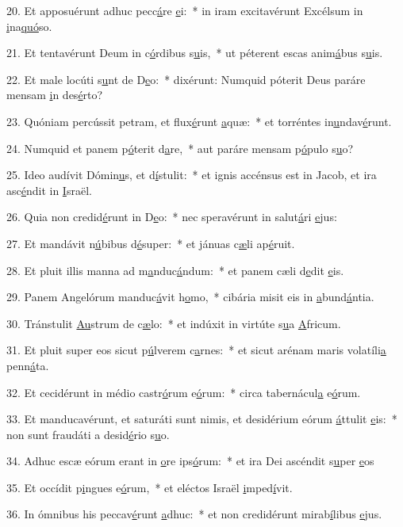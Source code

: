 20. Et apposuérunt adhuc pecc\uline{á}re \uline{e}i:~* in iram excitavérunt Excélsum in \uline{i}na\uline{quó}so.\par 
21. Et tentavérunt Deum in c\uline{ó}rdibus s\uline{u}is,~* ut péterent escas anim\uline{á}bus s\uline{u}is.\par 
22. Et male locúti s\uline{u}nt de D\uline{e}o:~* dixérunt: Numquid póterit Deus paráre mensam \uline{i}n des\uline{é}rto?\par 
23. Quóniam percússit petram, et flux\uline{é}runt \uline{a}quæ:~* et torréntes in\uline{u}ndav\uline{é}runt.\par 
24. Numquid et panem p\uline{ó}terit d\uline{a}re,~* aut paráre mensam p\uline{ó}pulo s\uline{u}o?\par 
25. Ideo audívit Dómin\uline{u}s, et d\uline{í}stulit:~* et ignis accénsus est in Jacob, et ira asc\uline{é}ndit in \uline{I}sraël.\par 
26. Quia non credid\uline{é}runt in D\uline{e}o:~* nec speravérunt in salut\uline{á}ri \uline{e}jus:\par 
27. Et mandávit n\uline{ú}bibus d\uline{é}super:~* et jánuas c\uline{æ}li ap\uline{é}ruit.\par 
28. Et pluit illis manna ad m\uline{a}nduc\uline{á}ndum:~* et panem cæli d\uline{e}dit \uline{e}is.\par 
29. Panem Angelórum manduc\uline{á}vit h\uline{o}mo,~* cibária misit eis in \uline{a}bund\uline{á}ntia.\par 
30. Tránstulit \uline{Au}strum de c\uline{æ}lo:~* et indúxit in virtúte s\uline{u}a \uline{A}fricum.\par 
31. Et pluit super eos sicut p\uline{ú}lverem c\uline{a}rnes:~* et sicut arénam maris volatíli\uline{a} penn\uline{á}ta.\par 
32. Et cecidérunt in médio castr\uline{ó}rum e\uline{ó}rum:~* circa tabernácul\uline{a} e\uline{ó}rum.\par 
33. Et manducavérunt, et saturáti sunt nimis, et desidérium eórum \uline{á}ttulit \uline{e}is:~* non sunt fraudáti a desid\uline{é}rio s\uline{u}o.\par 
34. Adhuc escæ eórum erant in \uline{o}re ips\uline{ó}rum:~* et ira Dei ascéndit s\uline{u}per \uline{e}os\par 
35. Et occídit p\uline{i}ngues e\uline{ó}rum,~* et eléctos Israël \uline{i}mped\uline{í}vit.\par 
36. In ómnibus his peccav\uline{é}runt \uline{a}dhuc:~* et non credidérunt mirab\uline{í}libus \uline{e}jus.\par 
